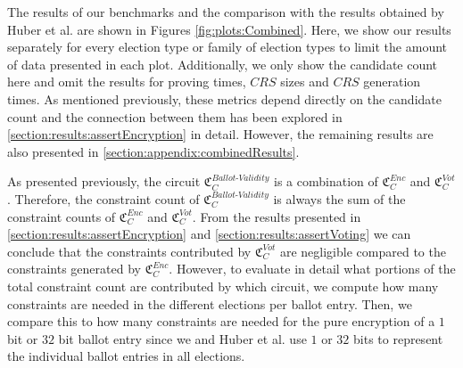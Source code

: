 The results of our benchmarks and the comparison with the results obtained by Huber et al. are shown in Figures \ref{fig:plots:Combined}.
Here, we show our results separately for every election type or family of election types to limit the amount of data presented in each plot.
Additionally, we only show the candidate count here and omit the results for proving times, $CRS$ sizes and $CRS$ generation times.
As mentioned previously, these metrics depend directly on the candidate count and the connection between them has been explored in \cref{section:results:assertEncryption} in detail.
However, the remaining results are also presented in \cref{section:appendix:combinedResults}.

As presented previously, the circuit $\mathfrak{C}_{C}^{Ballot\text{-}Validity}$ is a combination of $\mathfrak{C}_C^{Enc}$ and $\mathfrak{C}_C^{Vot}$.
Therefore, the constraint count of $\mathfrak{C}_C^{Ballot\text{-}Validity}$ is always the sum of the constraint counts of $\mathfrak{C}_C^{Enc}$ and $\mathfrak{C}_C^{Vot}$.
From the results presented in \cref{section:results:assertEncryption} and \cref{section:results:assertVoting} we can conclude that the constraints contributed by $\mathfrak{C}_C^{Vot}$ are negligible compared to the constraints generated by $\mathfrak{C}_C^{Enc}$.
However, to evaluate in detail what portions of the total constraint count are contributed by which circuit, we compute how many constraints are needed in the different elections per ballot entry.
Then, we compare this to how many constraints are needed for the pure encryption of a $1$ bit or $32$ bit ballot entry since we and Huber et al. use $1$ or $32$ bits to represent the individual ballot entries in all elections.
